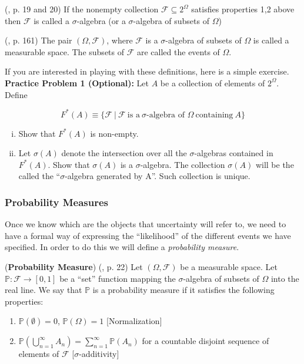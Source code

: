 \documentclass[11pt]{article} %
\begin{document}
\begin{definition} (\cite{Billingsley95}, p. 19 and 20)
	If the nonempty collection $\mathcal{F} \subseteq 2^{\Omega}$ satisfies properties 1,2 above then $\mathcal{F}$ is called a $\sigma$-algebra (or a $\sigma$-algebra of subsets of $\Omega$)  
\end{definition}

\begin{definition} (\cite{Billingsley95}, p. 161)
	The pair $(\Omega, \mathcal{F})$, where $\mathcal{F}$ is a $\sigma$-algebra of subsets of $\Omega$ is called a measurable space. The subsets of $\mathcal{F}$ are called the events of $\Omega$.
\end{definition}

\noindent If you are interested in playing with these definitions, here is a simple exercise. \\

\textbf{Practice Problem 1 (Optional):} Let $A$ be a collection of elements of $2^\Omega$. Define 

$$F^*(A) \equiv \{\mathcal{F} \: | \: \mathcal{F} \: \text{is a} \: \sigma\text{-algebra of } \Omega \: \text{containing} \: A\} $$

\begin{enumerate}[i)]
\item Show that $F^*(A)$ is non-empty. 
\item Let $\sigma(A)$ denote the intersection over all the $\sigma$-algebras contained in $F^*(A)$. Show that $\sigma(A)$ is a $\sigma$-algebra. The collection $\sigma(A)$ will be the called the ``$\sigma$-algebra generated by A''. Such collection is unique.
\end{enumerate}

\subsubsection{Probability Measures}

Once we know which are the objects that uncertainty will refer to, we need to have a formal way of expressing the ``likelihood'' of the different events we have specified. In order to do this we will define a \emph{probability measure}. 

\begin{definition} (\textbf{Probability Measure}) (\cite{Billingsley95}, p. 22) Let $(\Omega, \mathcal{F})$ be a measurable space. Let $\mathbb{P}: \mathcal{F} \rightarrow [0,1]$ be a ``set'' function mapping the $\sigma$-algebra of subsets of $\Omega$ into the real line. We say that $\mathbb{P}$ is a probability measure if it satisfies the following properties:
\begin{enumerate}
	\item $\mathbb{P}(\emptyset)=0$, $\mathbb{P}(\Omega)=1$ [Normalization]
	\item $\mathbb{P}(\bigcup_{n=1}^{\infty} A_n)= \sum_{n=1}^{\infty} \mathbb{P}(A_n)$ for a countable disjoint sequence of elements of $\mathcal{F}$ [$\sigma$-additivity]\\
\end{enumerate}
\end{definition}
\end{document}

